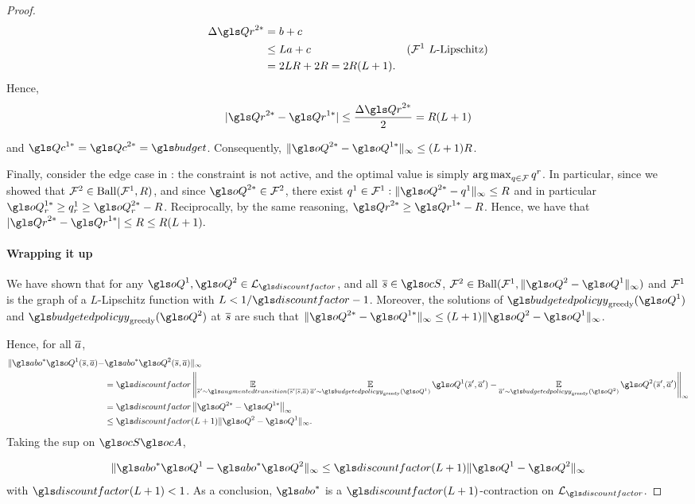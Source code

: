 \begin{proof}
    \begin{align*}
        \Delta \Qr^{2*} &= b + c &\\
        & \leq La + c & \text{($\cF^1$ $L$-Lipschitz)}\\
        &= 2LR+2R = 2R(L+1).
    \end{align*}
    Hence,
    \begin{equation*}
        | \Qr^{2*} - \Qr^{1*}| \leq \frac{\Delta \Qr^{2*}}{2} = R(L+1)
    \end{equation*}

    and $\Qc^{1*} = \Qc^{2*} = \budget$.
    Consequently, $ \|\oQ^{2*} - \oQ^{1*}\|_\infty \leq (L+1)R$.

    Finally, consider the edge case in : the constraint is not active, and the optimal value is simply $\operatorname*{arg\,max}_{q\in\mathcal{F}} q^r$. In particular, since we showed that $\mathcal{F}^2\in \text{Ball}(\mathcal{F}^1, R)$, and since $\oQ^{2*}\in \cF^2$, there exist $q^1\in \cF^1: \|\oQ^{2*}-q^1\|_\infty\leq R$ and in particular $\oQ^{1*}_r \geq q^1_r \geq \oQ^{2*}_r - R$. Reciprocally, by the same reasoning, $\Qr^{2*} \geq \Qr^{1*} - R$. Hence, we have that $| \Qr^{2*} - \Qr^{1*}| \leq R \leq R(L+1).$

    \paragraph{Wrapping it up}

    We have shown that for any $\oQ^1,\oQ^2\in\cL_{\discountfactor}$,
    and all $\os\in\ocS$, $\cF^2\in\text{Ball}(\cF^1,\|\oQ^2-\oQ^1\|_\infty)$ and $\mathcal{F}^1$ is
    the graph of a $L$-Lipschitz function with $L<1/\discountfactor - 1$.
    Moreover, the solutions of $\budgetedpolicy_\text{greedy}(\oQ^1)$ and $\budgetedpolicy_\text{greedy}(\oQ^2)$ at
    $\overline{s}$ are such that $ \|\oQ^{2*} - \oQ^{1*}\|_\infty \leq (L+1)\|\oQ^2-\oQ^1\|_\infty$.

    Hence, for all $\overline{a}$,
    \begin{align*}
        \|\abo^{*}\oQ^1(\os, \oa) - &\abo^{*}\oQ^2(\os, \oa)\|_\infty \\
        &= \discountfactor\left\|\expectedvalueover{\os'\sim\augmentedtransition(\os'|\os,\oa)}
        \expectedvalueover{\oa'\sim\budgetedpolicy_\text{greedy}(\oQ^1)}\oQ^1(\os',\oa') -
        \expectedvalueover{\oa'\sim\budgetedpolicy_\text{greedy}(\oQ^2)}\oQ^2(\os',\oa')\right\|_\infty \\
        &= \discountfactor\left\|\oQ^{2*} - \oQ^{1*}\right\|_\infty \\
        &\leq \discountfactor(L+1)\|\oQ^2-\oQ^1\|_\infty.
    \end{align*}
    Taking the sup on $\ocS\ocA$,

    \begin{equation*}
        \|\abo^{*}\oQ^1 - \abo^{*}\oQ^2\|_\infty \leq \discountfactor(L+1)\|\oQ^1-\oQ^2\|_\infty
    \end{equation*}
    with $\discountfactor(L+1) < 1$.
    As a conclusion, $\abo^{*}$ is a $\discountfactor(L+1)$-contraction on $\cL_{\discountfactor}$.
\end{proof}



